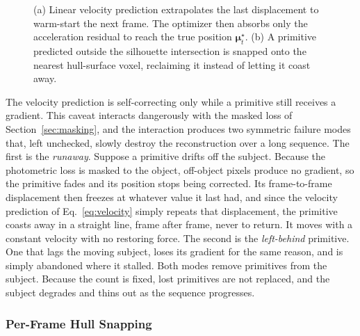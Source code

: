 \begin{figure}[!ht]
    \centering
    
    \caption{(a) Linear velocity prediction extrapolates the last displacement to
    warm-start the next frame. The optimizer then absorbs only the acceleration
    residual to reach the true position $\boldsymbol{\mu}^{\star}_t$. (b) A primitive
    predicted outside the silhouette intersection is snapped onto the nearest
    hull-surface voxel, reclaiming it instead of letting it coast away.}
    \label{fig:velocity-snap}
\end{figure}

The velocity prediction is self-correcting only while a primitive still receives a
gradient. This caveat interacts dangerously with the masked loss of
Section~\ref{sec:masking}, and the interaction produces two symmetric failure modes
that, left unchecked, slowly destroy the reconstruction over a long sequence. The first is the \emph{runaway}. Suppose a primitive drifts off the subject. Because
the photometric loss is masked to the object, off-object pixels produce no gradient,
so the primitive fades and its position stops being corrected. Its frame-to-frame
displacement then freezes at whatever value it last had, and since the velocity
prediction of Eq.~\eqref{eq:velocity} simply repeats that displacement, the primitive
coasts away in a straight line, frame after frame, never to return. It moves with a constant
velocity with no restoring force. The second is the \emph{left-behind} primitive. One
that lags the moving subject, loses its gradient for the same reason, and is simply
abandoned where it stalled. Both modes remove primitives from the subject. Because the
count is fixed, lost primitives are not replaced, and the subject degrades and thins
out as the sequence progresses.

\subsubsection{Per-Frame Hull Snapping}

